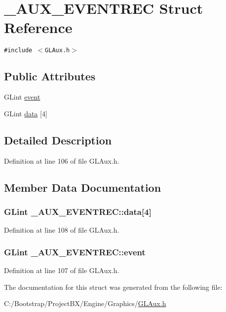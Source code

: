 \hypertarget{struct___a_u_x___e_v_e_n_t_r_e_c}{
\section{\_\-AUX\_\-EVENTREC Struct Reference}
\label{struct___a_u_x___e_v_e_n_t_r_e_c}
}
{\tt \#include $<$GLAux.h$>$}

\subsection*{Public Attributes}
\begin{CompactItemize}
\item 
GLint \hyperlink{struct___a_u_x___e_v_e_n_t_r_e_c_f8f0b43ef41044f380f886a6845a8673}{event}
\item 
GLint \hyperlink{struct___a_u_x___e_v_e_n_t_r_e_c_05ad57186353026f285ceb9e610dee6f}{data} \mbox{[}4\mbox{]}
\end{CompactItemize}


\subsection{Detailed Description}


Definition at line 106 of file GLAux.h.

\subsection{Member Data Documentation}
\hypertarget{struct___a_u_x___e_v_e_n_t_r_e_c_05ad57186353026f285ceb9e610dee6f}{
\subsubsection[{data}]{\setlength{\rightskip}{0pt plus 5cm}GLint {\bf \_\-AUX\_\-EVENTREC::data}\mbox{[}4\mbox{]}}}
\label{struct___a_u_x___e_v_e_n_t_r_e_c_05ad57186353026f285ceb9e610dee6f}




Definition at line 108 of file GLAux.h.\hypertarget{struct___a_u_x___e_v_e_n_t_r_e_c_f8f0b43ef41044f380f886a6845a8673}{
\subsubsection[{event}]{\setlength{\rightskip}{0pt plus 5cm}GLint {\bf \_\-AUX\_\-EVENTREC::event}}}
\label{struct___a_u_x___e_v_e_n_t_r_e_c_f8f0b43ef41044f380f886a6845a8673}




Definition at line 107 of file GLAux.h.

The documentation for this struct was generated from the following file:\begin{CompactItemize}
\item 
C:/Bootstrap/ProjectBX/Engine/Graphics/\hyperlink{_g_l_aux_8h}{GLAux.h}\end{CompactItemize}
